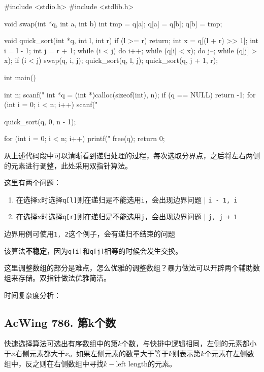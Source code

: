 \begin{mycpptwocol}
#include <stdio.h>
#include <stdlib.h>

void swap(int *q, int a, int b) {
    int tmp = q[a];
    q[a] = q[b];
    q[b] = tmp;
}

void quick_sort(int *q, int l, int r)
{
    if (l >= r) {
        return;
    }
    int x = q[(l + r) >> 1];
    int i = l - 1;
    int j = r + 1;
    while (i < j) {
        do i++; while (q[i] < x);
        do j--; while (q[j] > x);
        if (i < j) {
            swap(q, i, j);
        }
    }
    quick_sort(q, l, j);
    quick_sort(q, j + 1, r);
}

int main() {
    int n;
    scanf("%
    int *q = (int *)calloc(sizeof(int), n);
    if (q == NULL) {
        return -1;
    }
    for (int i = 0; i < n; i++) {
        scanf("%
    }

    quick_sort(q, 0, n - 1);

    for (int i = 0; i < n; i++) {
        printf("%
    } 
    free(q);
    return 0;
}
\end{mycpptwocol}

从上述代码段中可以清晰看到递归处理的过程，每次选取分界点，之后将左右两侧的元素进行调整，此处采用双指针算法。

\begin{keypoint}
    这里有两个问题：
    \begin{enumerate}
        \item 在选择x时选择\lstinline{q[l]}则在递归是不能选用\lstinline{i}，会出现边界问题 | \lstinline{i - 1, i}
        \item 在选择x时选择\lstinline{q[r]}则在递归是不能选用\lstinline{j}，会出现边界问题 | \lstinline{j, j + 1}
    \end{enumerate}

    边界用例可使用\lstinline{1, 2}这个例子，会有递归不结束的问题
\end{keypoint}

\begin{information}
  该算法\textbf{不稳定}，因为\lstinline{q[i]}和\lstinline{q[j]}相等的时候会发生交换。

  这里调整数组的部分是难点，怎么优雅的调整数组？暴力做法可以开辟两个辅助数组来存储。双指针做法优雅简洁。
\end{information}

时间复杂度分析：

\subsection{AcWing 786. 第k个数}
快速选择算法可选出有序数组中的第$k$个数，与快排中逻辑相同，左侧的元素都小于$x$右侧元素都大于$x$。如果左侧元素的数量大于等于$k$则表示第$k$个元素在左侧数组中，反之则在右侧数组中寻找$k-\text{left length}$的元素。

